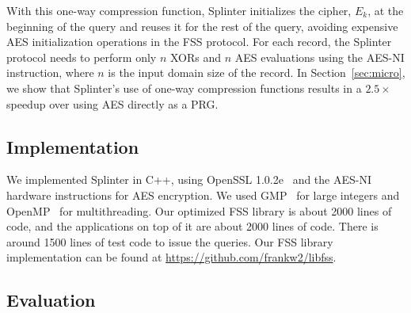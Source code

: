 With this one-way compression function, Splinter initializes the cipher, $E_k$,
at the beginning of the query and reuses it
for the rest of the query, avoiding
expensive AES initialization operations in the FSS protocol. 
For each record, the Splinter protocol 
needs to perform only $n$ XORs and $n$ AES
evaluations using the AES-NI instruction, where
$n$ is the input domain size of the record. 
In Section~\ref{sec:micro}, we show that Splinter's use of one-way compression functions
results in a 
$2.5\times$ speedup over using AES directly as a PRG.

\subsection{Implementation}
\label{sec:implementation}

We implemented Splinter in C++, using OpenSSL 1.0.2e~\cite{openssl} 
and the AES-NI hardware instructions
for AES encryption. We used 
GMP~\cite{gmp} for large integers and OpenMP~\cite{openmp} for multithreading.
Our optimized FSS library is about 2000 lines of code, and the applications on top of it are about 2000 lines of code. There is around 
1500 lines of test code to issue the queries. 
Our FSS library implementation can be found at \url{https://github.com/frankw2/libfss}.

\subsection{Evaluation}
\label{sec:evaluation}

